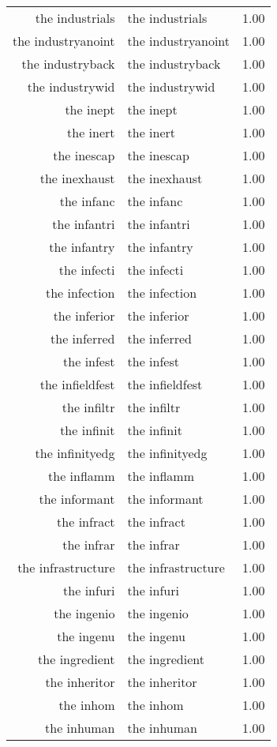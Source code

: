 \begin{table}[ht]
\begin{tabular}{rlr}
  the industrials & the industrials & 1.00 \\ 
  the industryanoint & the industryanoint & 1.00 \\ 
  the industryback & the industryback & 1.00 \\ 
  the industrywid & the industrywid & 1.00 \\ 
  the inept & the inept & 1.00 \\ 
  the inert & the inert & 1.00 \\ 
  the inescap & the inescap & 1.00 \\ 
  the inexhaust & the inexhaust & 1.00 \\ 
  the infanc & the infanc & 1.00 \\ 
  the infantri & the infantri & 1.00 \\ 
  the infantry & the infantry & 1.00 \\ 
  the infecti & the infecti & 1.00 \\ 
  the infection & the infection & 1.00 \\ 
  the inferior & the inferior & 1.00 \\ 
  the inferred & the inferred & 1.00 \\ 
  the infest & the infest & 1.00 \\ 
  the infieldfest & the infieldfest & 1.00 \\ 
  the infiltr & the infiltr & 1.00 \\ 
  the infinit & the infinit & 1.00 \\ 
  the infinityedg & the infinityedg & 1.00 \\ 
  the inflamm & the inflamm & 1.00 \\ 
  the informant & the informant & 1.00 \\ 
  the infract & the infract & 1.00 \\ 
  the infrar & the infrar & 1.00 \\ 
  the infrastructure & the infrastructure & 1.00 \\ 
  the infuri & the infuri & 1.00 \\ 
  the ingenio & the ingenio & 1.00 \\ 
  the ingenu & the ingenu & 1.00 \\ 
  the ingredient & the ingredient & 1.00 \\ 
  the inheritor & the inheritor & 1.00 \\ 
  the inhom & the inhom & 1.00 \\ 
  the inhuman & the inhuman & 1.00 \\ 

\end{tabular}
\end{table}
